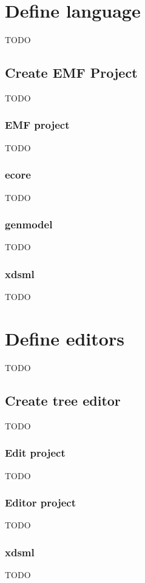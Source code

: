 \documentclass{gemoc} %
\begin{document}
\section{Define language}
\label{sec:Define_language}

TODO

\subsection{Create EMF Project}
TODO


\subsubsection{EMF project}
TODO
\subsubsection{ecore}
TODO
\subsubsection{genmodel}
TODO
\subsubsection{xdsml}
TODO
\section{Define editors}
\label{sec:Define_editors}

TODO

\subsection{Create tree editor}
TODO


\subsubsection{Edit project}
TODO
\subsubsection{Editor project}
TODO
\subsubsection{xdsml}
TODO
\end{document}
